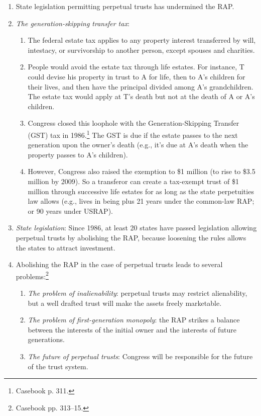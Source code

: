 \begin{enumerate}
    \item State legislation permitting perpetual trusts has undermined the 
    RAP.
    \item \emph{The generation-skipping transfer tax}:
    \begin{enumerate}
        \item The federal estate tax applies to any property interest 
        transferred by will, intestacy, or survivorship to another person, 
        except spouses and charities.
        \item People would avoid the estate tax through life estates. For 
        instance, T could devise his property in trust to A for life, then to 
        A's children for their lives, and then have the principal divided 
        among A's grandchildren. The estate tax would apply at T's death but 
        not at the death of A or A's children.
        \item Congress closed this loophole with the Generation-Skipping 
        Transfer (GST) tax in 1986.\footnote{Casebook p. 311.} The GST is due 
        if the estate passes to the next generation upon the owner's death 
        (e.g., it's due at A's death when the property passes to A's 
        children).
        \item However, Congress also raised the exemption to \$1 million (to 
        rise to \$3.5 million by 2009). So a transferor can create a 
        tax-exempt trust of \$1 million through successive life estates for as 
        long as the state perpetuities law allows (e.g., lives in being plus 
        21 years under the common-law RAP; or 90 years under USRAP).
    \end{enumerate}
    \item \emph{State legislation}: Since 1986, at least 20 states have passed 
    legislation allowing perpetual trusts by abolishing the RAP, because 
    loosening the rules allows the states to attract investment.
    \item Abolishing the RAP in the case of perpetual trusts leads to several 
    problems:\footnote{Casebook pp. 313--15.}
    \begin{enumerate}
        \item \emph{The problem of inalienability}: perpetual trusts may 
        restrict alienability, but a well drafted trust will make the assets 
        freely marketable.
        \item \emph{The problem of first-generation monopoly}: the RAP strikes 
        a balance between the interests of the initial owner and the interests 
        of future generations.
        \item \emph{The future of perpetual trusts}: Congress will be 
        responsible for the future of the trust system.
    \end{enumerate}
\end{enumerate}

